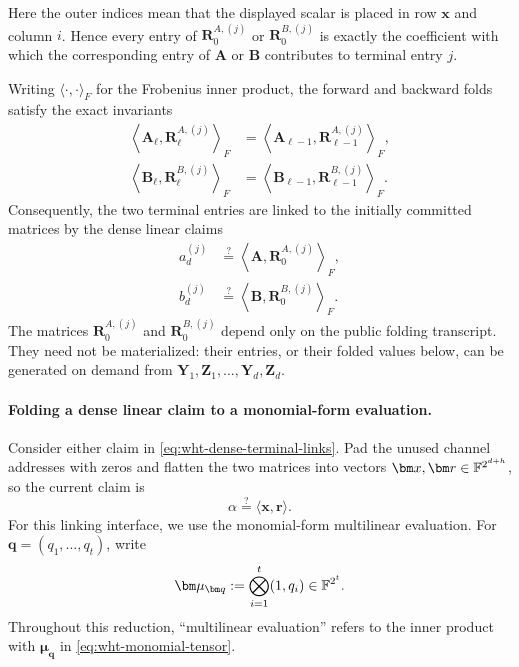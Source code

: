 \documentclass[runningheads]{llncs}
\begin{document}
Here the outer indices mean that the displayed scalar is placed in row
\(\bm x\) and column \(i\).  Hence every entry of \(\bm R_0^{A,(j)}\)
or \(\bm R_0^{B,(j)}\) is exactly the coefficient with which the
corresponding entry of \(\bm A\) or \(\bm B\) contributes to terminal
entry \(j\).

Writing \(\langle\cdot,\cdot\rangle_F\) for the Frobenius inner
product, the forward and backward folds satisfy the exact invariants
\begin{equation}
\begin{aligned}
    \left\langle
      \bm A_\ell,\bm R_\ell^{A,(j)}
    \right\rangle_F
      &=
    \left\langle
      \bm A_{\ell-1},\bm R_{\ell-1}^{A,(j)}
    \right\rangle_F,\\
    \left\langle
      \bm B_\ell,\bm R_\ell^{B,(j)}
    \right\rangle_F
      &=
    \left\langle
      \bm B_{\ell-1},\bm R_{\ell-1}^{B,(j)}
    \right\rangle_F.
\end{aligned}
\label{eq:wht-adjoint-invariant}
\end{equation}
Consequently, the two terminal entries are linked to the initially
committed matrices by the dense linear claims
\begin{equation}
\begin{aligned}
    a_d^{(j)}
      &\stackrel{?}{=}
      \left\langle\bm A,\bm R_0^{A,(j)}\right\rangle_F,\\
    b_d^{(j)}
      &\stackrel{?}{=}
      \left\langle\bm B,\bm R_0^{B,(j)}\right\rangle_F.
\end{aligned}
\label{eq:wht-dense-terminal-links}
\end{equation}
The matrices \(\bm R_0^{A,(j)}\) and \(\bm R_0^{B,(j)}\) depend only
on the public folding transcript.  They need not be materialized: their
entries, or their folded values below, can be generated on demand from
\(\bm Y_1,\bm Z_1,\ldots,\bm Y_d,\bm Z_d\).

\paragraph{Folding a dense linear claim to a monomial-form evaluation.}
Consider either claim in \eqref{eq:wht-dense-terminal-links}.  Pad the
unused channel addresses with zeros and flatten the two matrices into
vectors \(\bm x,\bm r\in\Field^{2^{d+h}}\), so the current claim is
\[
    \alpha\stackrel{?}{=}\langle\bm x,\bm r\rangle.
\]
For this linking interface, we use the monomial-form multilinear
evaluation.  For \(\bm q=(q_1,\ldots,q_t)\), write
\begin{equation}
    \bm\mu_{\bm q}
      :=
      \bigotimes_{i=1}^{t}(1,q_i)
      \in\Field^{2^t}.
\label{eq:wht-monomial-tensor}
\end{equation}
Throughout this reduction, ``multilinear evaluation'' refers to the
inner product with \(\bm\mu_{\bm q}\) in
\eqref{eq:wht-monomial-tensor}.
\end{document}
